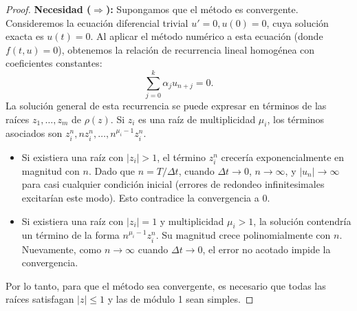 \documentclass[a4paper,11pt]{report}
\begin{document}
\begin{proof}
\textbf{Necesidad ($\Rightarrow$):}
Supongamos que el método es convergente. Consideremos la ecuación diferencial trivial $u' = 0, u(0) = 0$, cuya solución exacta es $u(t) = 0$. Al aplicar el método numérico a esta ecuación (donde $f(t,u)=0$), obtenemos la relación de recurrencia lineal homogénea con coeficientes constantes:
\[ \sum_{j=0}^k \alpha_j u_{n+j} = 0. \]
La solución general de esta recurrencia se puede expresar en términos de las raíces $z_1, \dots, z_m$ de $\rho(z)$. Si $z_i$ es una raíz de multiplicidad $\mu_i$, los términos asociados son $z_i^n, n z_i^n, \dots, n^{\mu_i-1} z_i^n$.
\begin{itemize}
    \item Si existiera una raíz con $|z_i| > 1$, el término $z_i^n$ crecería exponencialmente en magnitud con $n$. Dado que $n = T/\Delta t$, cuando $\Delta t \to 0$, $n \to \infty$, y $|u_n| \to \infty$ para casi cualquier condición inicial (errores de redondeo infinitesimales excitarían este modo). Esto contradice la convergencia a 0.
    \item Si existiera una raíz con $|z_i| = 1$ y multiplicidad $\mu_i > 1$, la solución contendría un término de la forma $n^{\mu_i-1} z_i^n$. Su magnitud crece polinomialmente con $n$. Nuevamente, como $n \to \infty$ cuando $\Delta t \to 0$, el error no acotado impide la convergencia.
\end{itemize}
Por lo tanto, para que el método sea convergente, es necesario que todas las raíces satisfagan $|z| \leq 1$ y las de módulo 1 sean simples.


\end{proof}
\end{document}
